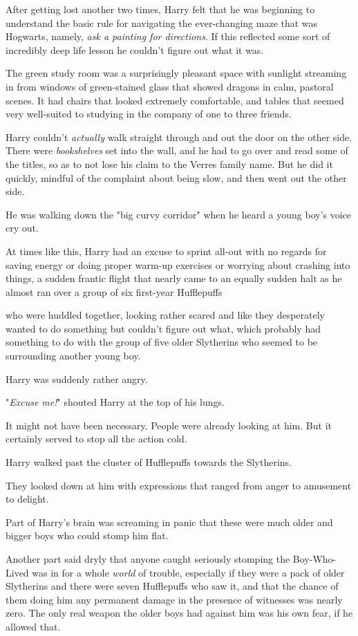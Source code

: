 After getting lost another two times, Harry felt that he was beginning to
understand the basic rule for navigating the ever-changing maze that was
Hogwarts, namely, \emph{ask a painting for directions}. If this reflected some
sort of incredibly deep life lesson he couldn't figure out what it was.

The green study room was a surprisingly pleasant space with sunlight streaming
in from windows of green-stained glass that showed dragons in calm, pastoral
scenes. It had chairs that looked extremely comfortable, and tables that seemed
very well-suited to studying in the company of one to three friends.

Harry couldn't \emph{actually} walk straight through and out the door on the
other side. There were \emph{bookshelves} set into the wall, and he had to go
over and read some of the titles, so as to not lose his claim to the Verres
family name. But he did it quickly, mindful of the complaint about being slow,
and then went out the other side.

He was walking down the "big curvy corridor" when he heard a young boy's voice
cry out.

At times like this, Harry had an excuse to sprint all-out with no regards for
saving energy or doing proper warm-up exercises or worrying about crashing into
things, a sudden frantic flight that nearly came to an equally sudden halt as
he almost ran over a group of six first-year Hufflepuffs{\el}

{\el} who were huddled together, looking rather scared and like they
desperately wanted to do something but couldn't figure out what, which probably
had something to do with the group of five older Slytherins who seemed to be
surrounding another young boy.

Harry was suddenly rather angry.

"\emph{Excuse me!}" shouted Harry at the top of his lungs.

It might not have been necessary. People were already looking at him. But it
certainly served to stop all the action cold.

Harry walked past the cluster of Hufflepuffs towards the Slytherins.

They looked down at him with expressions that ranged from anger to amusement to
delight.

Part of Harry's brain was screaming in panic that these were much older and
bigger boys who could stomp him flat.

Another part said dryly that anyone caught seriously stomping the Boy-Who-Lived
was in for a whole \emph{world} of trouble, especially if they were a pack of
older Slytherins and there were seven Hufflepuffs who saw it, and that the
chance of them doing him any permanent damage in the presence of witnesses was
nearly zero. The only real weapon the older boys had against him was his own
fear, if he allowed that.

